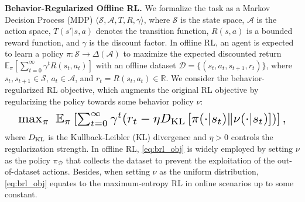 \textbf{Behavior-Regularized Offline RL. }We formalize the task as a Markov Decision Process (MDP) $\langle\mathcal{S}, \mathcal{A}, T, R, \gamma\rangle$, where $\mathcal{S}$ is the state space, $\mathcal{A}$ is the action space, $T(s'|s, a)$ denotes the transition function, $R(s, a)$ is a bounded reward function, and $\gamma$ is the discount factor. In offline RL, an agent is expected to learn a policy $\pi: \mathcal{S}\rightarrow \Delta(\mathcal{A})$ to maximize the expected discounted return $\mathbb{E}_{\pi}[\sum_{t=0}^\infty\gamma^tR(s_t, a_t)]$ with an offline dataset $\mathcal{D}=\{(s_t,a_t,s_{t+1},r_t)\}$, where $s_t, s_{t+1}\in\mathcal{S}$, $a_t\in\mathcal{A}$, and $r_t=R(s_t,a_t)\in\mathbb{R}$. 
We consider the behavior-regularized RL objective, which augments the original RL objective by regularizing the policy towards some behavior policy $\nu$:
\begin{equation}\label{eq:brl_obj}
    \begin{aligned}
    \resizebox{0.95\linewidth}{!}{$
        \max_{\pi}\ \mathbb{E}_{\pi}\left[\sum_{t=0}^\infty\gamma^t(r_t-\eta\KL{\pi(\cdot|s_t)}{\nu(\cdot|s_t)})\right],
        $}
    \end{aligned}
\end{equation}
where $D_{\rm KL}$ is the Kullback-Leibler (KL) divergence and $\eta>0$ controls the regularization strength. In offline RL, \eqref{eq:brl_obj} is widely employed by setting $\nu$ as the policy $\pi_{\mathcal{D}}$ that collects the dataset to prevent the exploitation of the out-of-dataset actions. Besides, when setting $\nu$ as the uniform distribution, \eqref{eq:brl_obj} equates to the maximum-entropy RL in online scenarios up to some constant. 

